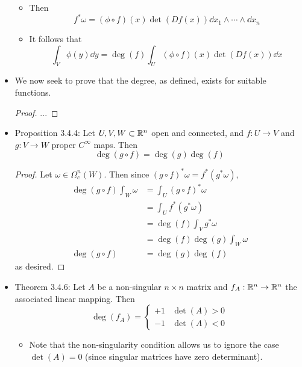 \documentclass[../notes.tex]{subfiles}
\begin{document}
\begin{itemize}
\begin{itemize}
        \item Then
        \begin{equation*}
            f^*\omega = (\phi\circ f)(x)\det(Df(x))\dd{x_1}\wedge\cdots\wedge\dd{x_n}
        \end{equation*}
        \item It follows that
        \begin{equation*}
            \int_V\phi(y)\dd{y} = \deg(f)\int_U(\phi\circ f)(x)\det(Df(x))\dd{x}
        \end{equation*}
    \end{itemize}
    \item We now seek to prove that the degree, as defined, exists for suitable functions.
    \begin{proof}
        ...
    \end{proof}
    \item Proposition 3.4.4: Let $U,V,W\subset\mathbb{R}^n$ open and connected, and $f:U\to V$ and $g:V\to W$ proper $C^\infty$ maps. Then
    \begin{equation*}
        \deg(g\circ f) = \deg(g)\deg(f)
    \end{equation*}
    \begin{proof}
        Let $\omega\in\Omega_c^n(W)$. Then since $(g\circ f)^*\omega=f^*(g^*\omega)$,
        \begin{align*}
            \deg(g\circ f)\int_W\omega &= \int_U(g\circ f)^*\omega\\
            &= \int_Uf^*(g^*\omega)\\
            &= \deg(f)\int_Vg^*\omega\\
            &= \deg(f)\deg(g)\int_W\omega\\
            \deg(g\circ f) &= \deg(g)\deg(f)
        \end{align*}
        as desired.
    \end{proof}
    \item Theorem 3.4.6: Let $A$ be a non-singular $n\times n$ matrix and $f_A:\mathbb{R}^n\to\mathbb{R}^n$ the associated linear mapping. Then
    \begin{equation*}
        \deg(f_A) =
        \begin{cases}
            +1 & \det(A)>0\\
            -1 & \det(A)<0
        \end{cases}
    \end{equation*}
    \begin{itemize}
        \item Note that the non-singularity condition allows us to ignore the case $\det(A)=0$ (since singular matrices have zero determinant).

\end{itemize}
\end{itemize}
\end{document}
